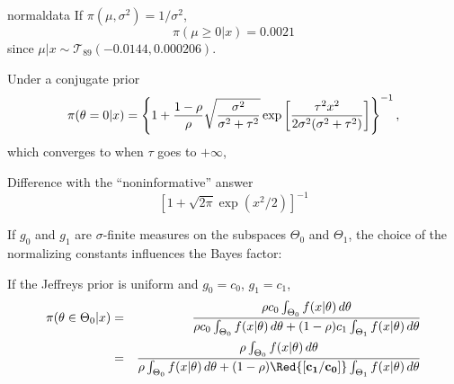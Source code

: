 \begin{slide}
\pause\medskip
\begin{block}{{\sf normaldata}}
If $\pi(\mu,\sigma^2)=1/\sigma^2$, 
$$
\pi(\mu\ge 0|x) = 0.0021
$$
since $\mu|x\sim\mathscr{T}_{89}(-0.0144,0.000206)$.
\end{block}

\end{slide}\begin{slide}

Under a conjugate prior
$$
\pi(\theta=0|x) = \left\{ 1+{1-\rho\over \rho} 
	\sqrt{{\sigma^2\over \sigma^2+\tau^2}} \exp
  \left[{\tau^2x^2\over 2\sigma^2(\sigma^2+\tau^2)}\right] \right\}^{-1} ,
$$
which converges to  when $\tau$ goes to $+\infty$, 

\medskip\pause
Difference with the ``noninformative'' answer 
$$
[1+\sqrt{2\pi}\exp(x^2/2)]^{-1}
$$

\end{slide}\begin{slide}
If $g_0$ and $g_1$ are $\sigma$-finite measures 
on the subspaces $\Theta_0$ and $\Theta_1$, the choice of the normalizing constants 
influences the Bayes factor: 


\pause
\debut If the Jeffreys prior is uniform and $g_0=c_0$, $g_1=c_1$, 
\small
\begin{eqnarray*}
\pi(\theta\in\Theta_0|x) &=& {\rho c_0\int_{\Theta_0} f(x|\theta)\,d\theta
	    \over \rho c_0\int_{\Theta_0} f(x|\theta)\,d\theta +
	   (1-\rho)c_1\int_{\Theta_1} f(x|\theta)\,d\theta }\\
&=& {\rho \int_{\Theta_0} f(x|\theta)\,d\theta
            \over \rho \int_{\Theta_0} f(x|\theta)\,d\theta +
           (1-\rho)\Red{\mathbf{[c_1/c_0]}}\int_{\Theta_1} f(x|\theta)\,d\theta }
\end{eqnarray*}
\normalsize
\fin

\end{slide}

